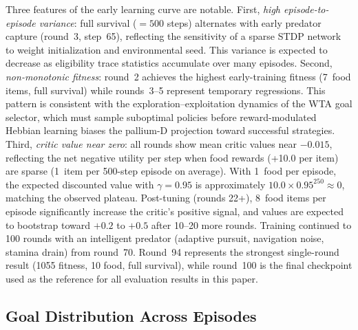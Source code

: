 \documentclass[12pt]{article}
\begin{document}
Three features of the early learning curve are notable.
First, \emph{high episode-to-episode variance}: full survival ($=500$ steps)
alternates with early predator capture (round~3, step~65), reflecting
the sensitivity of a sparse STDP network to weight initialization
and environmental seed.
This variance is expected to decrease as eligibility trace statistics
accumulate over many episodes.
Second, \emph{non-monotonic fitness}: round~2 achieves the highest
early-training fitness (7~food items, full survival) while rounds~3--5
represent temporary regressions.
This pattern is consistent with the exploration--exploitation dynamics
of the WTA goal selector, which must sample suboptimal policies
before reward-modulated Hebbian learning biases the pallium-D projection
toward successful strategies.
Third, \emph{critic value near zero}: all rounds show mean critic values
near $-0.015$, reflecting the net negative utility per step when food rewards
(+10.0 per item) are sparse (1~item per 500-step episode on average).
With 1~food per episode, the expected discounted value with $\gamma = 0.95$
is approximately $10.0 \times 0.95^{250} \approx 0$, matching the observed
plateau.
Post-tuning (rounds 22+), 8~food items per episode significantly increase the
critic's positive signal, and values are expected to bootstrap toward
$+0.2$ to $+0.5$ after 10--20 more rounds.
Training continued to 100 rounds with an intelligent predator
(adaptive pursuit, navigation noise, stamina drain) from round~70.
Round~94 represents the strongest single-round result (1055 fitness,
10 food, full survival), while round~100 is the final checkpoint
used as the reference for all evaluation results in this paper.

\subsection{Goal Distribution Across Episodes}
\end{document}
